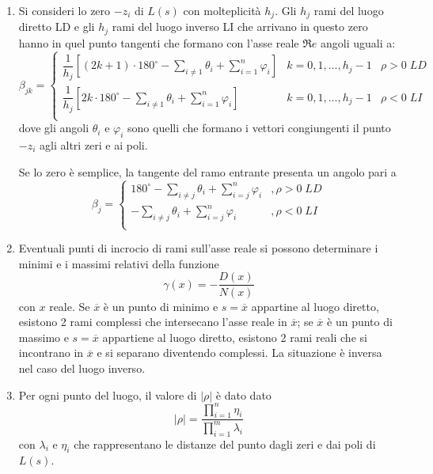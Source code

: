 \documentclass[a4paper]{report}
\begin{document}
\begin{enumerate}
\[\begin{array}{lll}
    ..., h_j - 1, & \rho < 0 LI
  \end{array}
  \right .
  \]
  dove gli angoli $\varphi_i$ e $\theta_i$ son oquelli calcolati in
  base alla F3, considerando i vettori congiungenti il punto $s =
  -p_j$ agli altri poli e agli zeri. Se il polo \`e semplice, la
  tangente del ramo uscente presenta un angolo pari a:
  \[
  a_j =
  \left \{
  \begin{array}{ll}
    180^{\circ} + \sum\limits_{i = 1}^{m} \theta_i - \sum\limits_{i \neq j}
    \varphi_i &, \rho > 0 LD\\
    \sum\limits_{i = 1}^{m} \theta_i - \sum\limits_{i \neq j} \varphi_i &, \rho < 0 LI
  \end{array}
    \right .
  \]
\item Si consideri lo zero $-z_i$ di $L(s)$ con molteplicit\`a
  $h_j$. Gli $h_j$ rami del luogo diretto LD e gli $h_j$ rami del
  luogo inverso LI che arrivano in questo zero hanno in quel punto
  tangenti che formano con l'asse reale $\mathfrak{R}e$ angoli uguali
  a:
  \[
  \beta_{jk} =
  \left\{
  \begin{array}{lll}
    \dfrac{1}{h_j}\left[ (2k + 1)\cdot 180^{\circ} - \sum\limits_{i
        \neq 1} \theta_i + \sum\limits_{i=1}^{n}\varphi_i \right] & k
    = 0, 1, ..., h_j - 1 & \rho > 0\;LD\\
    \dfrac{1}{h_j}\left[ 2k\cdot 180^{\circ} - \sum\limits_{i
        \neq 1} \theta_i + \sum\limits_{i=1}^{n}\varphi_i \right] & k
    = 0, 1, ..., h_j - 1 & \rho < 0\;LI\\
  \end{array}
  \right .
  \]
  dove gli angoli $\theta_i$ e $\varphi_i$ sono quelli che formano i
  vettori congiungenti il punto $-z_i$ agli altri zeri e ai poli.

  Se lo zero \`e semplice, la tangente del ramo entrante presenta un
  angolo pari a
  \[
  \beta_j =
  \left\{
  \begin{array}{ll}
  180^{\circ} - \sum\limits_{i \neq j}\theta_i + \sum\limits_{i = j}^n
  \varphi_i &, \rho > 0 \; LD\\
  - \sum\limits_{i \neq j}\theta_i + \sum\limits_{i = j}^n
  \varphi_i &, \rho < 0 \; LI\\
  \end{array}
  \right .
  \]
\item Eventuali punti di incrocio di rami sull'asse reale si possono
  determinare i minimi e i massimi relativi della funzione
  \[
  \gamma(x) = -\dfrac{D(x)}{N(x)}
  \]
  con $x$ reale. Se $\overline{x}$ \`e un punto di minimo e $s =
  \overline{x}$ appartine al luogo diretto, esistono 2 rami complessi
  che intersecano l'asse reale in $\overline{x}$; se $\overline{x}$
  \`e un punto di massimo e $s = \overline{x}$ appartiene al luogo
  diretto, esistono 2 rami reali che si incontrano in $\overline{x}$ e
  si separano diventendo complessi. La situazione \`e inversa nel caso
  del luogo inverso.
\item Per ogni punto del luogo, il valore di $|\rho|$ \`e dato dato
  \[
  |\rho| = \dfrac{\prod\limits_{i = 1}^{n} \eta_i}{\prod\limits_{i =
      1}^{m}\lambda_i} 
  \]
  con $\lambda_i$ e $\eta_i$ che rappresentano le distanze del punto
  dagli zeri e dai poli di $L(s)$.
\end{enumerate}
\end{document}
